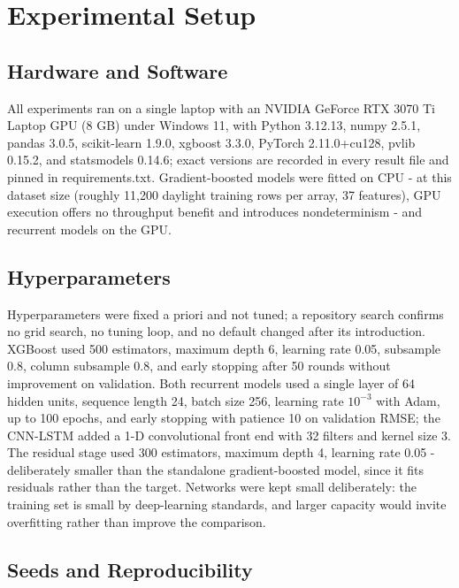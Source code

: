 \section{Experimental Setup}
\label{sec:experimental}

\subsection{Hardware and Software}
\label{sec:experimental-hardware-software}

All experiments ran on a single laptop with an NVIDIA GeForce RTX 3070
Ti Laptop GPU (8 GB) under Windows 11, with Python 3.12.13, numpy
2.5.1, pandas 3.0.5, scikit-learn 1.9.0, xgboost 3.3.0, PyTorch
2.11.0+cu128, pvlib 0.15.2, and statsmodels 0.14.6; exact versions are
recorded in every result file and pinned in requirements.txt.
Gradient-boosted models were fitted on CPU - at this dataset size
(roughly 11,200 daylight training rows per array, 37 features), GPU
execution offers no throughput benefit and introduces nondeterminism -
and recurrent models on the GPU.

\subsection{Hyperparameters}
\label{sec:experimental-hyperparameters}

Hyperparameters were fixed a priori and not tuned; a repository search
confirms no grid search, no tuning loop, and no default changed after
its introduction. XGBoost used 500 estimators, maximum depth 6,
learning rate 0.05, subsample 0.8, column subsample 0.8, and early
stopping after 50 rounds without improvement on validation. Both
recurrent models used a single layer of 64 hidden units, sequence
length 24, batch size 256, learning rate $10^{-3}$ with Adam, up to
100 epochs, and early stopping with patience 10 on validation RMSE; the
CNN-LSTM added a 1-D convolutional front end with 32 filters and kernel
size 3. The residual stage used 300 estimators, maximum depth 4,
learning rate 0.05 - deliberately smaller than the standalone
gradient-boosted model, since it fits residuals rather than the
target. Networks were kept small deliberately: the training set is
small by deep-learning standards, and larger capacity would invite
overfitting rather than improve the comparison.

\subsection{Seeds and Reproducibility}
\label{sec:experimental-seeds}

